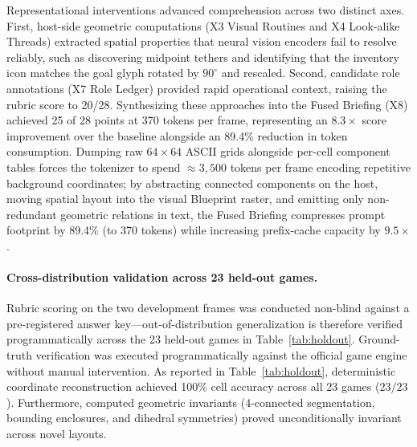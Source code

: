 Representational interventions advanced comprehension across two distinct axes. First, host-side geometric computations (X3 Visual Routines and X4 Look-alike Threads) extracted spatial properties that neural vision encoders fail to resolve reliably, such as discovering midpoint tethers and identifying that the  inventory icon matches the goal glyph rotated by $90^\circ$ and rescaled. Second, candidate role annotations (X7 Role Ledger) provided rapid operational context, raising the rubric score to 20/28. Synthesizing these approaches into the Fused Briefing (X8) achieved 25 of 28 points at 370 tokens per frame, representing an $8.3\times$ score improvement over the baseline alongside an 89.4\% reduction in token consumption. Dumping raw $64\times 64$ ASCII grids alongside per-cell component tables forces the tokenizer to spend $\approx 3{,}500$ tokens per frame encoding repetitive background coordinates; by abstracting connected components on the host, moving spatial layout into the visual Blueprint raster, and emitting only non-redundant geometric relations in text, the Fused Briefing compresses prompt footprint by 89.4\% (to 370 tokens) while increasing prefix-cache capacity by $9.5\times$.

\paragraph{Cross-distribution validation across 23 held-out games.}
Rubric scoring on the two development frames was conducted non-blind against a pre-registered answer key---out-of-distribution generalization is therefore verified programmatically across the 23 held-out games in Table~\ref{tab:holdout}. Ground-truth verification was executed programmatically against the official game engine without manual intervention. 
As reported in Table~\ref{tab:holdout}, deterministic coordinate reconstruction achieved 100\% cell accuracy across all 23 games ($23/23$). Furthermore, computed geometric invariants (4-connected segmentation, bounding enclosures, and dihedral symmetries) proved unconditionally invariant across novel layouts.

